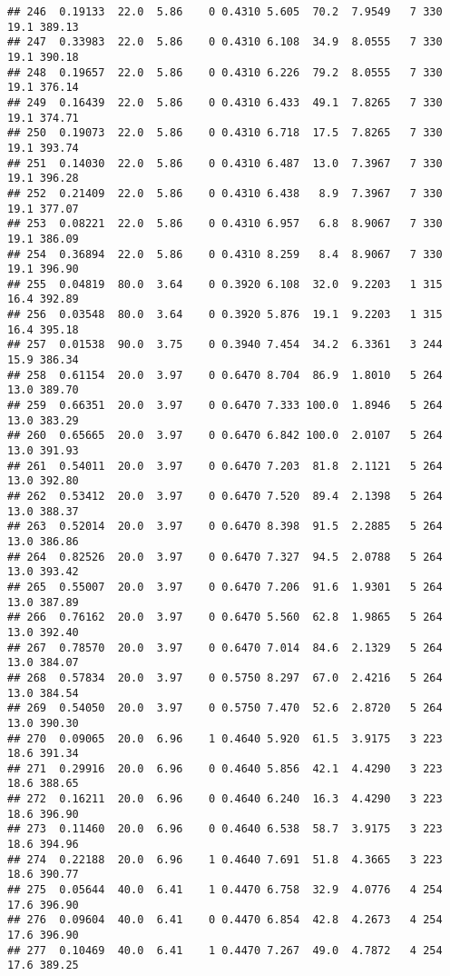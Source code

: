 \documentclass[
]{article}
\begin{document}
\begin{verbatim}
## 246  0.19133  22.0  5.86    0 0.4310 5.605  70.2  7.9549   7 330    19.1 389.13
## 247  0.33983  22.0  5.86    0 0.4310 6.108  34.9  8.0555   7 330    19.1 390.18
## 248  0.19657  22.0  5.86    0 0.4310 6.226  79.2  8.0555   7 330    19.1 376.14
## 249  0.16439  22.0  5.86    0 0.4310 6.433  49.1  7.8265   7 330    19.1 374.71
## 250  0.19073  22.0  5.86    0 0.4310 6.718  17.5  7.8265   7 330    19.1 393.74
## 251  0.14030  22.0  5.86    0 0.4310 6.487  13.0  7.3967   7 330    19.1 396.28
## 252  0.21409  22.0  5.86    0 0.4310 6.438   8.9  7.3967   7 330    19.1 377.07
## 253  0.08221  22.0  5.86    0 0.4310 6.957   6.8  8.9067   7 330    19.1 386.09
## 254  0.36894  22.0  5.86    0 0.4310 8.259   8.4  8.9067   7 330    19.1 396.90
## 255  0.04819  80.0  3.64    0 0.3920 6.108  32.0  9.2203   1 315    16.4 392.89
## 256  0.03548  80.0  3.64    0 0.3920 5.876  19.1  9.2203   1 315    16.4 395.18
## 257  0.01538  90.0  3.75    0 0.3940 7.454  34.2  6.3361   3 244    15.9 386.34
## 258  0.61154  20.0  3.97    0 0.6470 8.704  86.9  1.8010   5 264    13.0 389.70
## 259  0.66351  20.0  3.97    0 0.6470 7.333 100.0  1.8946   5 264    13.0 383.29
## 260  0.65665  20.0  3.97    0 0.6470 6.842 100.0  2.0107   5 264    13.0 391.93
## 261  0.54011  20.0  3.97    0 0.6470 7.203  81.8  2.1121   5 264    13.0 392.80
## 262  0.53412  20.0  3.97    0 0.6470 7.520  89.4  2.1398   5 264    13.0 388.37
## 263  0.52014  20.0  3.97    0 0.6470 8.398  91.5  2.2885   5 264    13.0 386.86
## 264  0.82526  20.0  3.97    0 0.6470 7.327  94.5  2.0788   5 264    13.0 393.42
## 265  0.55007  20.0  3.97    0 0.6470 7.206  91.6  1.9301   5 264    13.0 387.89
## 266  0.76162  20.0  3.97    0 0.6470 5.560  62.8  1.9865   5 264    13.0 392.40
## 267  0.78570  20.0  3.97    0 0.6470 7.014  84.6  2.1329   5 264    13.0 384.07
## 268  0.57834  20.0  3.97    0 0.5750 8.297  67.0  2.4216   5 264    13.0 384.54
## 269  0.54050  20.0  3.97    0 0.5750 7.470  52.6  2.8720   5 264    13.0 390.30
## 270  0.09065  20.0  6.96    1 0.4640 5.920  61.5  3.9175   3 223    18.6 391.34
## 271  0.29916  20.0  6.96    0 0.4640 5.856  42.1  4.4290   3 223    18.6 388.65
## 272  0.16211  20.0  6.96    0 0.4640 6.240  16.3  4.4290   3 223    18.6 396.90
## 273  0.11460  20.0  6.96    0 0.4640 6.538  58.7  3.9175   3 223    18.6 394.96
## 274  0.22188  20.0  6.96    1 0.4640 7.691  51.8  4.3665   3 223    18.6 390.77
## 275  0.05644  40.0  6.41    1 0.4470 6.758  32.9  4.0776   4 254    17.6 396.90
## 276  0.09604  40.0  6.41    0 0.4470 6.854  42.8  4.2673   4 254    17.6 396.90
## 277  0.10469  40.0  6.41    1 0.4470 7.267  49.0  4.7872   4 254    17.6 389.25

\end{verbatim}
\end{document}

